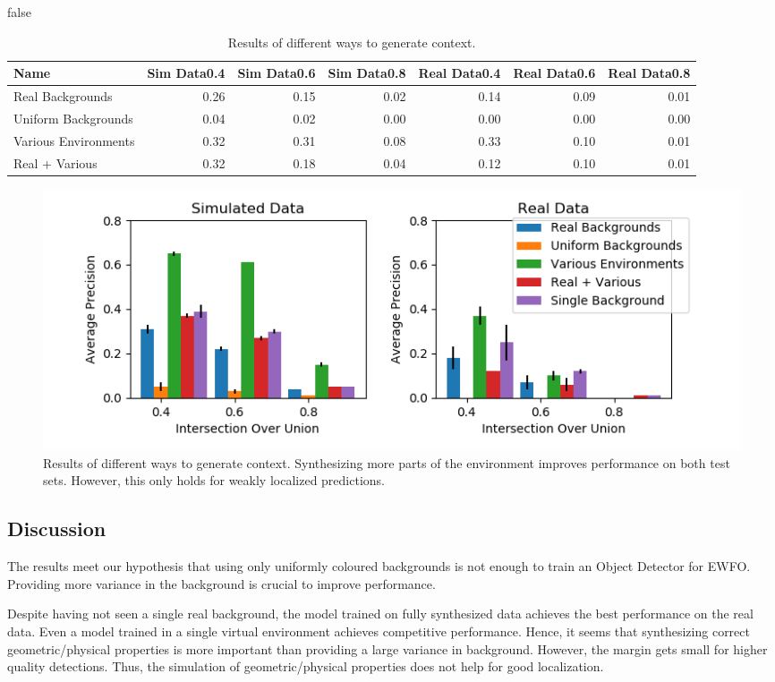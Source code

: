 \if false
\begin{table}[htbp]
	\caption{Results of different ways to generate context.}
	\begin{tabular}{lrrrrrr}
		\hline
		Name &  Sim Data0.4 &  Sim Data0.6 &  Sim Data0.8 &  Real Data0.4 &  Real Data0.6 &  Real Data0.8 \\
		\hline
		Real Backgrounds &         0.26 &         0.15 &         0.02 &          0.14 &          0.09 &          0.01 \\
		Uniform Backgrounds &         0.04 &         0.02 &         0.00 &          0.00 &          0.00 &          0.00 \\
		Various Environments &         0.32 &         0.31 &         0.08 &          0.33 &          0.10 &          0.01 \\
		Real + Various &         0.32 &         0.18 &         0.04 &          0.12 &          0.10 &          0.01 \\
		\hline
	\end{tabular}
	\label{tab:context}
\end{table}
\fi
\begin{figure}[htbp]
	\includegraphics[width=\textwidth]{fig/context_bar}
	\caption{Results of different ways to generate context. Synthesizing more parts of the environment improves performance on both test sets. However, this only holds for weakly localized predictions.}
	\label{fig:context}
\end{figure}

\subsection{Discussion}

The results meet our hypothesis that using only uniformly coloured backgrounds is not enough to train an Object Detector for \ac{EWFO}. Providing more variance in the background is crucial to improve performance.

Despite having not seen a single real background, the model trained on fully synthesized data achieves the best performance on the real data. Even a model trained in a single virtual environment achieves competitive performance. Hence, it seems that synthesizing correct geometric/physical properties is more important than providing a large variance in background. However, the margin gets small for higher quality detections. Thus, the simulation of geometric/physical properties does not help for good localization.

